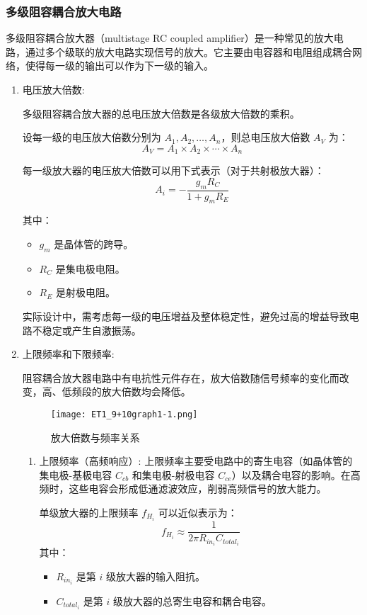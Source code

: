 \documentclass[dvipsnames, svgnames,a4paper,11pt]{article}
\begin{document}
	\subsubsection{多级阻容耦合放大电路}

	多级阻容耦合放大器（multistage RC coupled amplifier）是一种常见的放大电路，通过多个级联的放大电路实现信号的放大。它主要由电容器和电阻组成耦合网络，使得每一级的输出可以作为下一级的输入。

	\begin{enumerate}
		
		\item 电压放大倍数:
			
			多级阻容耦合放大器的总电压放大倍数是各级放大倍数的乘积。
			
			设每一级的电压放大倍数分别为 $A_1, A_2, \ldots, A_n$，则总电压放大倍数 $A_V$ 为：
			\[
			A_V = A_1 \times A_2 \times \cdots \times A_n
			\]

			每一级放大器的电压放大倍数可以用下式表示（对于共射极放大器）：
			\[
			A_i = -\frac{g_m R_C}{1 + g_m R_E}
			\]

			其中：
			\begin{itemize}
				\item $g_m$ 是晶体管的跨导。
				\item $R_C$ 是集电极电阻。
				\item $R_E$ 是射极电阻。
			\end{itemize}

			实际设计中，需考虑每一级的电压增益及整体稳定性，避免过高的增益导致电路不稳定或产生自激振荡。

		\item 上限频率和下限频率:
		
			阻容耦合放大器电路中有电抗性元件存在，放大倍数随信号频率的变化而改变，高、低频段的放大倍数均会降低。

			\begin{figure}[htbp]
				\centering
				\texttt{[image: ET1\_9+10graph1-1.png]}
				\caption{放大倍数与频率关系}
				\label{fig:fig1-1}
			\end{figure}

			\begin{enumerate}
				\item 上限频率（高频响应）:
					上限频率主要受电路中的寄生电容（如晶体管的集电极-基极电容 $C_{cb}$ 和集电极-射极电容 $C_{ce}$）以及耦合电容的影响。在高频时，这些电容会形成低通滤波效应，削弱高频信号的放大能力。

					单级放大器的上限频率 $f_{H_i}$ 可以近似表示为：
					\[
					f_{H_i} \approx \frac{1}{2 \pi R_{in_i} C_{total_i}}
					\]
					其中：
					\begin{itemize}
						\item $R_{in_i}$ 是第 $i$ 级放大器的输入阻抗。
						\item $C_{total_i}$ 是第 $i$ 级放大器的总寄生电容和耦合电容。
					\end{itemize}
					

\end{enumerate}
\end{enumerate}
\end{document}
